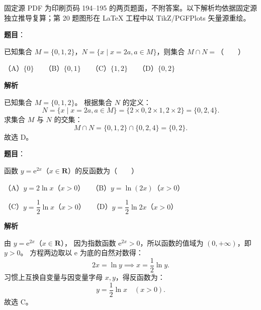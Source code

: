 

\begin{gktip}
固定源 PDF 为印刷页码 194–195 的两页题面，不附答案。以下解析均依据固定源独立推导复算；第 20 题图形在 LaTeX 工程中以 TikZ/PGFPlots 矢量源重绘。
\end{gktip}

\begin{answer}

\textbf{题目}：

已知集合 $M=\{0,1,2\}$，$N=\{x\mid x=2a,a\in M\}$，则集合 $M\cap N=$\mbox{（　　）}

（A）$\{0\}$　　（B）$\{0,1\}$　　（C）$\{1,2\}$　　（D）$\{0,2\}$

\textbf{解析}

已知集合 $M=\{0,1,2\}$。
根据集合 $N$ 的定义：
\nopagebreak[4]
\[
N=\{x\mid x=2a,a\in M\}=\{2\times 0,2\times 1,2\times 2\}=\{0,2,4\}.
\]
求集合 $M$ 与 $N$ 的交集：
\nopagebreak[4]
\[
M\cap N=\{0,1,2\}\cap\{0,2,4\}=\{0,2\}.
\]
故选 D。


\end{answer}
\begin{answer}

\textbf{题目}：

函数 $y=\mathrm{e}^{2x}$（$x\in\mathbf{R}$）的反函数为\mbox{（　　）}

（A）$y=2\ln x$（$x>0$）　　（B）$y=\ln(2x)$（$x>0$）

（C）$y=\dfrac{1}{2}\ln x$（$x>0$）　　（D）$y=\dfrac{1}{2}\ln 2x$（$x>0$）

\textbf{解析}

由 $y=\mathrm{e}^{2x}$（$x\in\mathbf{R}$），
因为指数函数 $\mathrm{e}^{2x}>0$，所以函数的值域为 $(0,+\infty)$，即 $y>0$。
方程两边取以 $\mathrm{e}$ 为底的自然对数得：
\nopagebreak[4]
\[
2x=\ln y\implies x=\frac{1}{2}\ln y.
\]
习惯上互换自变量与因变量字母 $x,y$，得反函数为：
\nopagebreak[4]
\[
y=\frac{1}{2}\ln x\quad (x>0).
\]
故选 C。


\end{answer}
